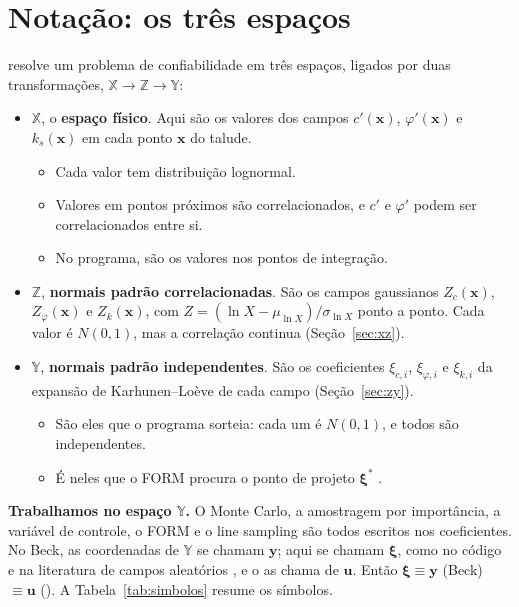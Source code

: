 \documentclass[11pt,a4paper]{article}
\newcommand{\X}{\mathbb{X}}
\newcommand{\Z}{\mathbb{Z}}
\newcommand{\Y}{\mathbb{Y}}
\newcommand{\xib}{\bm\xi}
\begin{document}
\section{Notação: os três espaços}\label{sec:espacos}
\citet[Seç.~4.3.3, Fig.~4-5]{beck2014} resolve um problema de confiabilidade em três espaços, ligados por duas
transformações, $\X \to \Z \to \Y$:
\begin{itemize}
  \item $\X$, o \textbf{espaço físico}. Aqui são os valores dos campos $c'(\bm x)$, $\varphi'(\bm x)$ e $k_s(\bm x)$
    em cada ponto $\bm x$ do talude.
    \begin{itemize}
      \item Cada valor tem distribuição lognormal.
      \item Valores em pontos próximos são correlacionados, e $c'$ e $\varphi'$ podem ser correlacionados entre si.
      \item No programa, são os valores nos pontos de integração.
    \end{itemize}
  \item $\Z$, \textbf{normais padrão correlacionadas}. São os campos gaussianos $Z_c(\bm x)$, $Z_\varphi(\bm x)$ e
    $Z_k(\bm x)$, com $Z = (\ln X - \mu_{\ln X})/\sigma_{\ln X}$ ponto a ponto. Cada valor é $N(0, 1)$, mas a correlação continua
    (Seção~\ref{sec:xz}).
  \item $\Y$, \textbf{normais padrão independentes}. São os coeficientes $\xi_{c,i}$, $\xi_{\varphi,i}$ e $\xi_{k,i}$ da
    expansão de Karhunen--Loève de cada campo (Seção~\ref{sec:zy}).
    \begin{itemize}
      \item São eles que o programa sorteia: cada um é $N(0, 1)$, e todos são independentes.
      \item É neles que o FORM procura o ponto de projeto $\xib^*$ \citep[Alg.~44]{beck2014}.
    \end{itemize}
\end{itemize}
\textbf{Trabalhamos no espaço $\Y$.} O Monte Carlo, a amostragem por importância, a variável de controle, o FORM e o
line sampling são todos escritos nos coeficientes. No Beck, as coordenadas de $\Y$ se chamam $\bm y$; aqui se chamam $\xib$, como no código
e na literatura de campos aleatórios \citep{ghanem1991}, e o  as chama de $\bm u$. Então
$\xib \equiv \bm y$ (Beck) $\equiv \bm u$ (). A Tabela~\ref{tab:simbolos} resume os símbolos.
\end{document}
